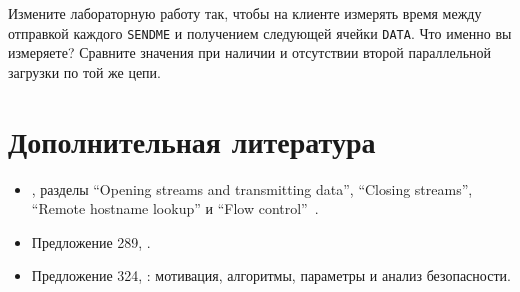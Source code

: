 \begin{esercizio}[3]\label{es:11-rtt}
Измените лабораторную работу так, чтобы на клиенте измерять время между отправкой каждого \texttt{SENDME} и получением следующей ячейки \texttt{DATA}. Что именно вы измеряете? Сравните значения при наличии и отсутствии второй параллельной загрузки по той же цепи.
\end{esercizio}

\section*{Дополнительная литература}
\begin{itemize}
  \item {}, разделы \enquote{Opening streams and transmitting data}, \enquote{Closing streams}, \enquote{Remote hostname lookup} и \enquote{Flow control}~\cite{torspec}.
  \item Предложение 289, .
  \item Предложение 324, : мотивация, алгоритмы, параметры и анализ безопасности.
\end{itemize}
